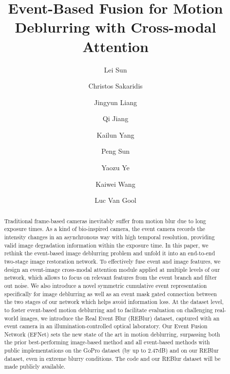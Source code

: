 \documentclass[runningheads]{llncs}
\newlength \g
\begin{document}
\pagestyle{headings}
\mainmatter
\def\ECCVSubNumber{}  
\title{Event-Based Fusion for Motion Deblurring with Cross-modal Attention}



\author{Lei Sun \and
Christos Sakaridis \and
Jingyun Liang \and
Qi Jiang \and
Kailun Yang \and
Peng Sun \and
Yaozu Ye \and
Kaiwei Wang \and
Luc Van Gool
}
\maketitle









\begin{abstract}
   Traditional frame-based cameras inevitably suffer from motion blur due to long exposure times. As a kind of bio-inspired camera, the event camera records the intensity changes in an asynchronous way with high temporal resolution, providing valid image degradation information within the exposure time. In this paper, we rethink the event-based image deblurring problem and unfold it into an end-to-end two-stage image restoration network. To effectively fuse event and image features, we design an event-image cross-modal attention module applied at multiple levels of our network, which allows to focus on relevant features from the event branch and filter out noise. We also introduce a novel symmetric cumulative event representation specifically for image deblurring as well as an event mask gated connection between the two stages of our network which helps avoid information loss. At the dataset level, to foster event-based motion deblurring and to facilitate evaluation on challenging real-world images, we introduce the Real Event Blur (REBlur) dataset, captured with an event camera in an illumination-controlled optical laboratory. Our Event Fusion Network (EFNet) sets the new state of the art in motion deblurring, surpassing both the prior best-performing image-based method and all event-based methods with public implementations on the GoPro dataset (by up to 2.47dB) and on our REBlur dataset, even in extreme blurry conditions. The code and our REBlur dataset will be made publicly available.
\end{abstract}
\end{document}
